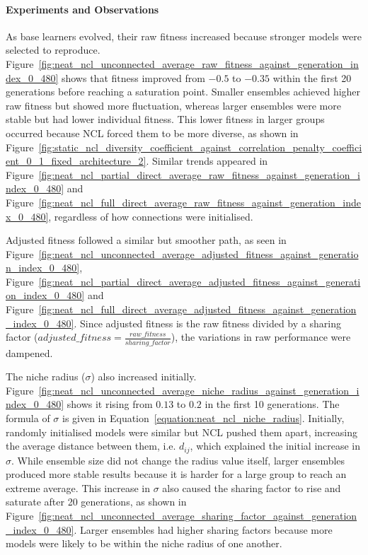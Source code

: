 \documentclass{article}
\begin{document}
\paragraph{Experiments and Observations}
As base learners evolved, their raw fitness increased because stronger models were selected to reproduce. Figure~\ref{fig:neat_ncl_unconnected_average_raw_fitness_against_generation_index_0_480} shows that fitness improved from $-0.5$ to $-0.35$ within the first 20 generations before reaching a saturation point. Smaller ensembles achieved higher raw fitness but showed more fluctuation, whereas larger ensembles were more stable but had lower individual fitness. This lower fitness in larger groups occurred because NCL forced them to be more diverse, as shown in Figure~\ref{fig:static_ncl_diversity_coefficient_against_correlation_penalty_coefficient_0_1_fixed_architecture_2}. Similar trends appeared in Figure~\ref{fig:neat_ncl_partial_direct_average_raw_fitness_against_generation_index_0_480} and Figure~\ref{fig:neat_ncl_full_direct_average_raw_fitness_against_generation_index_0_480}, regardless of how connections were initialised. 

Adjusted fitness followed a similar but smoother path, as seen in Figure~\ref{fig:neat_ncl_unconnected_average_adjusted_fitness_against_generation_index_0_480}, Figure~\ref{fig:neat_ncl_partial_direct_average_adjusted_fitness_against_generation_index_0_480} and Figure~\ref{fig:neat_ncl_full_direct_average_adjusted_fitness_against_generation_index_0_480}. Since adjusted fitness is the raw fitness divided by a sharing factor ($adjusted\_fitness = \frac{raw\_fitness}{sharing\_factor}$), the variations in raw performance were dampened. 

The niche radius ($\sigma$) also increased initially. Figure~\ref{fig:neat_ncl_unconnected_average_niche_radius_against_generation_index_0_480} shows it rising from $0.13$ to $0.2$ in the first 10 generations. The formula of $\sigma$ is given in Equation~\ref{equation:neat_ncl_niche_radius}. Initially, randomly initialised models were similar but NCL pushed them apart, increasing the average distance between them, i.e. $d_{ij}$, which explained the initial increase in $\sigma$. While ensemble size did not change the radius value itself, larger ensembles produced more stable results because it is harder for a large group to reach an extreme average. This increase in $\sigma$ also caused the sharing factor to rise and saturate after 20 generations, as shown in Figure~\ref{fig:neat_ncl_unconnected_average_sharing_factor_against_generation_index_0_480}. Larger ensembles had higher sharing factors because more models were likely to be within the niche radius of one another. 
\end{document}
